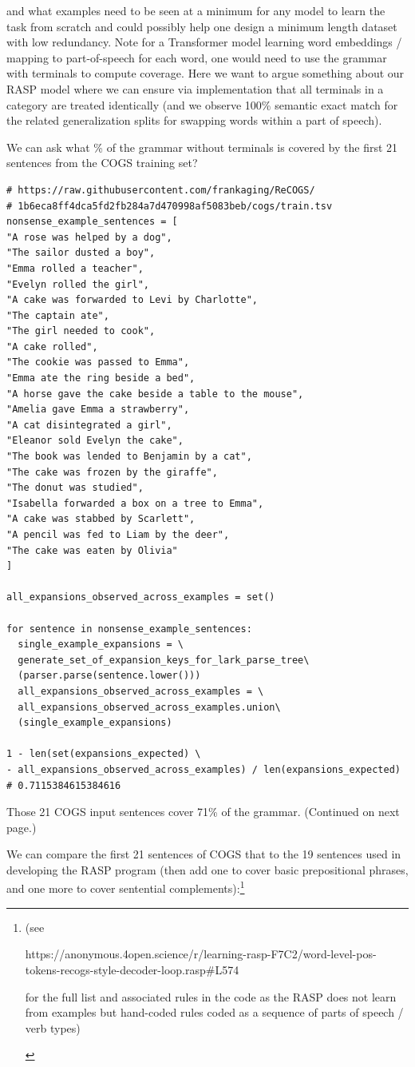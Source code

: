 \documentclass[11pt]{article}
\begin{document}
and what examples need to be seen at a minimum for any model to learn the task from scratch and could possibly help one design a minimum length dataset with low redundancy.
Note for a Transformer model learning word embeddings / mapping to part-of-speech for each word, one would need to use the grammar with terminals to compute coverage. Here we want to argue something about our RASP model where we can ensure via implementation that all terminals in a category are treated identically (and we observe 100\% semantic exact match for the related generalization splits for swapping words within a part of speech).


We can ask what \% of the grammar without terminals is covered by the first 21 sentences from the COGS training set?
\begin{tiny}
\begin{verbatim}
# https://raw.githubusercontent.com/frankaging/ReCOGS/
# 1b6eca8ff4dca5fd2fb284a7d470998af5083beb/cogs/train.tsv
nonsense_example_sentences = [
"A rose was helped by a dog",
"The sailor dusted a boy",
"Emma rolled a teacher",
"Evelyn rolled the girl",
"A cake was forwarded to Levi by Charlotte",
"The captain ate",
"The girl needed to cook",
"A cake rolled",
"The cookie was passed to Emma",
"Emma ate the ring beside a bed",
"A horse gave the cake beside a table to the mouse",
"Amelia gave Emma a strawberry",
"A cat disintegrated a girl",
"Eleanor sold Evelyn the cake",
"The book was lended to Benjamin by a cat",
"The cake was frozen by the giraffe",
"The donut was studied",
"Isabella forwarded a box on a tree to Emma",
"A cake was stabbed by Scarlett",
"A pencil was fed to Liam by the deer",
"The cake was eaten by Olivia"
]

all_expansions_observed_across_examples = set()

for sentence in nonsense_example_sentences:
  single_example_expansions = \
  generate_set_of_expansion_keys_for_lark_parse_tree\
  (parser.parse(sentence.lower()))
  all_expansions_observed_across_examples = \
  all_expansions_observed_across_examples.union\
  (single_example_expansions)

1 - len(set(expansions_expected) \
- all_expansions_observed_across_examples) / len(expansions_expected)
# 0.7115384615384616
\end{verbatim}
\end{tiny}
Those 21 COGS input sentences cover 71\% of the grammar. (Continued on next page.)

We can compare the first 21 sentences of COGS that to the 19 sentences used in developing the RASP program (then add one to cover basic prepositional phrases, and one more to cover sentential complements):\footnote{\begin{footnotesize}(see 

https://anonymous.4open.science/r/learning-rasp-F7C2/word-level-pos-tokens-recogs-style-decoder-loop.rasp\#L574

for the full list and associated rules in the code as the RASP does not learn from examples but hand-coded rules coded as a sequence of parts of speech / verb types)\end{footnotesize}}
\end{document}
